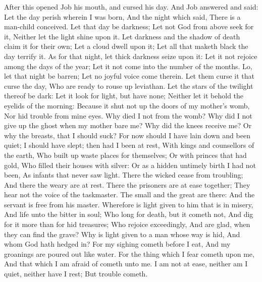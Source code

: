 After this opened Job his mouth, and cursed his day.  And Job answered and said:  Let the day perish wherein I was born, And the night which said, There is a man-child conceived.  Let that day be darkness; Let not God from above seek for it, Neither let the light shine upon it.  Let darkness and the shadow of death claim it for their own; Let a cloud dwell upon it; Let all that maketh black the day terrify it.  As for that night, let thick darkness seize upon it: Let it not rejoice among the days of the year; Let it not come into the number of the months.  Lo, let that night be barren; Let no joyful voice come therein.  Let them curse it that curse the day, Who are ready to rouse up leviathan.  Let the stars of the twilight thereof be dark: Let it look for light, but have none; Neither let it behold the eyelids of the morning:  Because it shut not up the doors of my mother’s womb, Nor hid trouble from mine eyes.  Why died I not from the womb? Why did I not give up the ghost when my mother bare me?  Why did the knees receive me? Or why the breasts, that I should suck?  For now should I have lain down and been quiet; I should have slept; then had I been at rest,  With kings and counsellors of the earth, Who built up waste places for themselves;  Or with princes that had gold, Who filled their houses with silver:  Or as a hidden untimely birth I had not been, As infants that never saw light.  There the wicked cease from troubling; And there the weary are at rest.  There the prisoners are at ease together; They hear not the voice of the taskmaster.  The small and the great are there: And the servant is free from his master.  Wherefore is light given to him that is in misery, And life unto the bitter in soul;  Who long for death, but it cometh not, And dig for it more than for hid treasures;  Who rejoice exceedingly, And are glad, when they can find the grave?  Why is light given to a man whose way is hid, And whom God hath hedged in?  For my sighing cometh before I eat, And my groanings are poured out like water.  For the thing which I fear cometh upon me, And that which I am afraid of cometh unto me.  I am not at ease, neither am I quiet, neither have I rest; But trouble cometh. 


